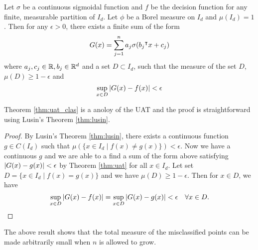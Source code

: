 \begin{theorem}
    \label{thm:uat_clas}
    Let $\sigma$ be a continuous sigmoidal function and $f$ be the decision
    function for any finite, measurable partition of $I_d$. Let $\phi$ be a
    Borel measure on $I_d$ and $\mu(I_d) = 1$. Then for any $\epsilon>0$, there
    exists a finite sum of the form
    \begin{equation}
        G(x) = \sum_{j=1}^n a_j \sigma(b_j{}^{\intercal} x + c_j)
    \end{equation}
    where $a_j, c_j \in \mathbb{R}, b_j \in \mathbb{R}^d$ and a set $D\subset I_d$, such that
    the measure of the set $D$, $\mu(D) \geq 1 - \epsilon$ and
    \begin{equation}
        \sup_{x\in D}\left| G(x) - f(x) \right| < \epsilon
    \end{equation}
\end{theorem}

Theorem \ref{thm:uat_clas} is a anoloy of the UAT and the proof is
straightforward using Lusin's Theorem \eqref{thm:lusin}.

\begin{proof}
    By Lusin's Theorem \eqref{thm:lusin}, there exists a continuous function $g
    \in C(I_d)$ such that $\mu(\{x\in I_d \mid f(x) \not= g(x)\}) < \epsilon$.
    Now we have a continuous $g$ and we are able to a find a sum of the form
    above satisfying $\left| G(x) - g(x) \right| < \epsilon$ by Theorem \eqref{thm:uat}
    for all $x\in I_d$. Let set $D = \{x\in I_d \mid f(x) = g(x)\}$ and we have
    $\mu(D) \geq 1 - \epsilon$. Then for $x\in D$, we have
    \begin{equation}
        \sup_{x\in D}\left| G(x)-f(x) \right| = \sup_{x\in D}\left| G(x) - g(x) \right| < \epsilon 
        \quad \forall x\in D.
    \end{equation}
\end{proof}

The above result shows that the total measure of the misclassified points can be
made arbitrarily small when $n$ is allowed to grow.


